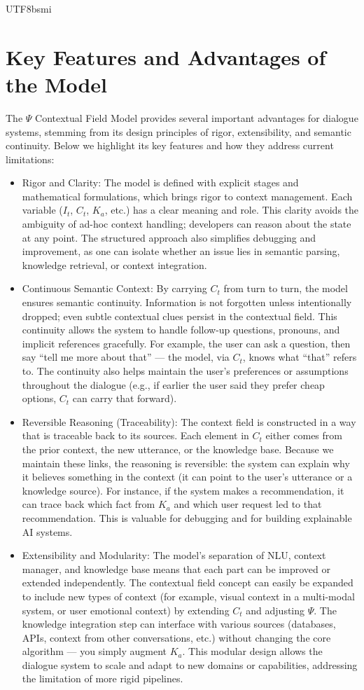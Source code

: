 \documentclass{article}
\begin{document}
\begin{CJK*}{UTF8}{bsmi}
\section{Key Features and Advantages of the Model}
The $\Psi$ Contextual Field Model provides several important advantages for dialogue systems, stemming from its design principles of rigor, extensibility, and semantic continuity. Below we highlight its key features and how they address current limitations:
\begin{itemize}[label=●]
    \item Rigor and Clarity: The model is defined with explicit stages and mathematical formulations, which brings rigor to context management. Each variable ($I_t$, $C_t$, $K_a$, etc.) has a clear meaning and role. This clarity avoids the ambiguity of ad-hoc context handling; developers can reason about the state at any point. The structured approach also simplifies debugging and improvement, as one can isolate whether an issue lies in semantic parsing, knowledge retrieval, or context integration.
    \item Continuous Semantic Context: By carrying $C_t$ from turn to turn, the model ensures semantic continuity. Information is not forgotten unless intentionally dropped; even subtle contextual clues persist in the contextual field. This continuity allows the system to handle follow-up questions, pronouns, and implicit references gracefully. For example, the user can ask a question, then say “tell me more about that” — the model, via $C_t$, knows what “that” refers to. The continuity also helps maintain the user’s preferences or assumptions throughout the dialogue (e.g., if earlier the user said they prefer cheap options, $C_t$ can carry that forward).
    \item Reversible Reasoning (Traceability): The context field is constructed in a way that is traceable back to its sources. Each element in $C_t$ either comes from the prior context, the new utterance, or the knowledge base. Because we maintain these links, the reasoning is reversible: the system can explain why it believes something in the context (it can point to the user’s utterance or a knowledge source). For instance, if the system makes a recommendation, it can trace back which fact from $K_a$ and which user request led to that recommendation. This is valuable for debugging and for building explainable AI systems.
    \item Extensibility and Modularity: The model’s separation of NLU, context manager, and knowledge base means that each part can be improved or extended independently. The contextual field concept can easily be expanded to include new types of context (for example, visual context in a multi-modal system, or user emotional context) by extending $C_t$ and adjusting $\Psi$. The knowledge integration step can interface with various sources (databases, APIs, context from other conversations, etc.) without changing the core algorithm — you simply augment $K_a$. This modular design allows the dialogue system to scale and adapt to new domains or capabilities, addressing the limitation of more rigid pipelines.

\end{itemize}
\end{CJK*}
\end{document}
